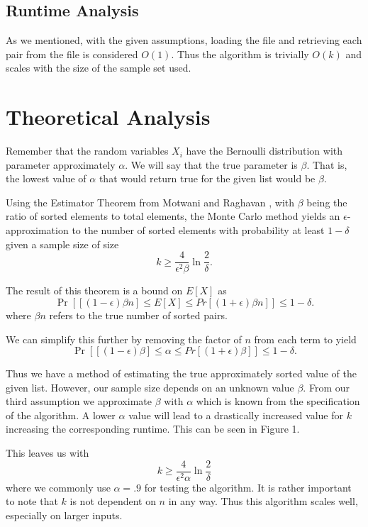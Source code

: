 \documentclass[11pt]{article}
\begin{document}
\subsection{Runtime Analysis}

As we mentioned, with the given assumptions, loading the file and retrieving each pair from the file is considered $O(1)$. Thus the algorithm is trivially $O(k)$ and scales with the size of the sample set used. 

\section{Theoretical Analysis}

Remember that the random variables $X_i$ have the Bernoulli distribution with parameter approximately $\alpha$. We will say that the true parameter is $\beta$. That is, the lowest value of $\alpha$ that would return true for the given list would be $\beta$. 

Using the Estimator Theorem from Motwani and Raghavan \cite{textbook}, with $\beta$ being the ratio of sorted elements to total elements, the Monte Carlo method yields an $\epsilon$-approximation to the number of sorted elements with probability at least $1-\delta$ given a sample size of size $$k \geq \frac{4}{\epsilon^2 \beta} \ln \frac{2}{\delta}.$$ 

The result of this theorem is a bound on $E[X]$ as $$\Pr\left[ [(1-\epsilon)\beta n] \leq E[X] \leq Pr[(1+\epsilon)\beta n] \right] \leq 1 - \delta.$$ where $\beta n$ refers to the true number of sorted pairs. 

We can simplify this further by removing the factor of $n$ from each term to yield $$\Pr\left[ [(1-\epsilon)\beta] \leq \alpha \leq Pr[(1+\epsilon)\beta] \right] \leq 1 - \delta.$$

Thus we have a method of estimating the true approximately sorted value of the given list. However, our sample size depends on an unknown value $\beta$. From our third assumption we approximate $\beta$ with $\alpha$ which is known from the specification of the algorithm. A lower $\alpha$ value will lead to a drastically increased value for $k$ increasing the corresponding runtime. This can be seen in Figure 1.

This leaves us with $$k \geq \frac{4}{\epsilon^2 \alpha} \ln \frac{2}{\delta}$$ where we commonly use $\alpha = .9$ for testing the algorithm. It is rather important to note that $k$ is not dependent on $n$ in any way. Thus this algorithm scales well, especially on larger inputs.
\end{document}
